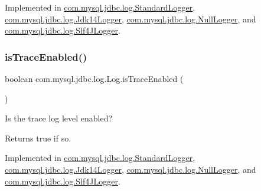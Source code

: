 Implemented in \mbox{\hyperlink{classcom_1_1mysql_1_1jdbc_1_1log_1_1_standard_logger_a843810f899e33afae8e6ac8d579c32cf}{com.\+mysql.\+jdbc.\+log.\+Standard\+Logger}}, \mbox{\hyperlink{classcom_1_1mysql_1_1jdbc_1_1log_1_1_jdk14_logger_aeab4dbb0e0a551d27dfd1b9bd6df5322}{com.\+mysql.\+jdbc.\+log.\+Jdk14\+Logger}}, \mbox{\hyperlink{classcom_1_1mysql_1_1jdbc_1_1log_1_1_null_logger_a0fd40d0617f53beec5f85253996a1e5f}{com.\+mysql.\+jdbc.\+log.\+Null\+Logger}}, and \mbox{\hyperlink{classcom_1_1mysql_1_1jdbc_1_1log_1_1_slf4_j_logger_aa1c98d717c733fbc6f6d6e68c129f387}{com.\+mysql.\+jdbc.\+log.\+Slf4\+J\+Logger}}.

\mbox{\label{interfacecom_1_1mysql_1_1jdbc_1_1log_1_1_log_a821407c0c861bbb9de4618617e2fa519}} 
\subsubsection{\texorpdfstring{is\+Trace\+Enabled()}{isTraceEnabled()}}
{\footnotesize\ttfamily boolean com.\+mysql.\+jdbc.\+log.\+Log.\+is\+Trace\+Enabled (\begin{DoxyParamCaption}{ }\end{DoxyParamCaption})}

Is the \textquotesingle{}trace\textquotesingle{} log level enabled?

\begin{DoxyReturn}{Returns}
true if so. 
\end{DoxyReturn}


Implemented in \mbox{\hyperlink{classcom_1_1mysql_1_1jdbc_1_1log_1_1_standard_logger_ab41b3c2553938c1ed5d76a20aff834b4}{com.\+mysql.\+jdbc.\+log.\+Standard\+Logger}}, \mbox{\hyperlink{classcom_1_1mysql_1_1jdbc_1_1log_1_1_jdk14_logger_a02f8d0f49784473a5c5250184001091a}{com.\+mysql.\+jdbc.\+log.\+Jdk14\+Logger}}, \mbox{\hyperlink{classcom_1_1mysql_1_1jdbc_1_1log_1_1_null_logger_af97ff4755fae09351593f88f65298b30}{com.\+mysql.\+jdbc.\+log.\+Null\+Logger}}, and \mbox{\hyperlink{classcom_1_1mysql_1_1jdbc_1_1log_1_1_slf4_j_logger_a464b8fdfdb20e2b18de01ec28395419b}{com.\+mysql.\+jdbc.\+log.\+Slf4\+J\+Logger}}.

\mbox{\label{interfacecom_1_1mysql_1_1jdbc_1_1log_1_1_log_ae786b79391cf28f119aa7b12226b7e2b}} 
